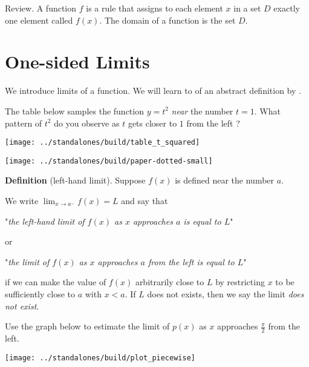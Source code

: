 \documentclass[../main.tex]{subfiles}
\begin{document}
\begin{mdframed}[style=withref]
  Review. A function \(f\) is a rule that assigns to {each} element \(x\) in a set \(D\) {exactly one} element called \(f(x)\). The {domain} of a function is the set \(D\).

\end{mdframed}

\section{One-sided Limits}
We introduce limits of a function. We will learn to  of an abstract definition by .

\begin{example}
  The table below samples the function \(y = t^{2}\) \emph{near} the number \(t = 1\).
  What pattern of \(t^{2}\) do you observe as \(t\) gets closer to \(1\) from the left ?

  \texttt{[image: ../standalones/build/table\_t\_squared]}
\end{example}
\texttt{[image: ../standalones/build/paper-dotted-small]}

\begin{mdframed}[style=withref]
  \textbf{Definition} (left-hand limit). Suppose \(f(x)\) is defined near the number \(a\).

  We write {\(\lim_{x \to a^{-}} f(x) = L\)} and say that
  \begin{center}
    "\emph{the {left-hand limit} of \(f(x)\) as \(x\) approaches \(a\) is equal to \(L\)}"
  \end{center}
  or
  \begin{center}
    "\emph{the {limit} of \(f(x)\) as \(x\) approaches \(a\) {from the left} is equal to \(L\)}"
  \end{center}
  if we can make the value of \(f(x)\) arbitrarily close to \(L\) by restricting \(x\) to be sufficiently close to \(a\) with \(x < a\). If \(L\) does not exists, then we say the limit \emph{does not exist}.

\end{mdframed}
\vfill

\begin{example}
  Use the graph below to estimate the limit of \(p(x)\) as \(x\) approaches \(\frac{\pi}{2}\) from the left.

  \texttt{[image: ../standalones/build/plot\_piecewise]}
\end{example}
\end{document}
